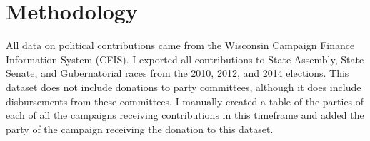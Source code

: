 \documentclass[11pt,]{article}
\begin{document}
\vskip -8.5pt



\noindent  

\section{Methodology}\label{methodology}

All data on political contributions came from the Wisconsin Campaign
Finance Information System (CFIS). I exported all contributions to State
Assembly, State Senate, and Gubernatorial races from the 2010, 2012, and
2014 elections. This dataset does not include donations to party
committees, although it does include disbursements from these
committees. I manually created a table of the parties of each of all the
campaigns receiving contributions in this timeframe and added the party
of the campaign receiving the donation to this dataset.
\end{document}
